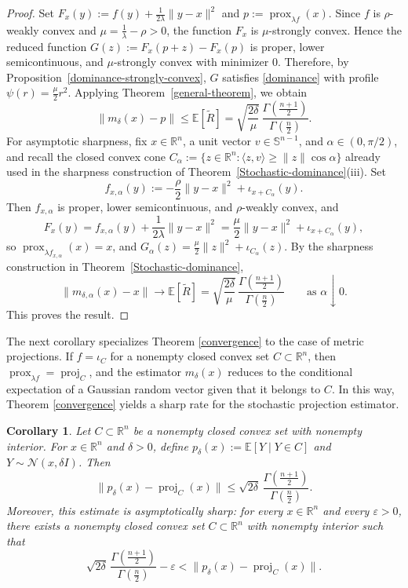 \documentclass[11pt]{article}
\newcommand{\1}{\mathds{1}}
\newtheorem{corollary}[theorem]{Corollary}
\theoremstyle{definition}
\theoremstyle{remark}
\theoremstyle{definition}
\begin{document}
\begin{proof}
Set $F_x(y):=f(y)+\frac{1}{2\lambda}\|y-x\|^2$ and $p:=\operatorname{prox}_{\lambda f}(x)$. Since \(f\) is \(\rho\)-weakly convex and \(\mu=\frac1\lambda-\rho>0\),
the function \(F_x\) is \(\mu\)-strongly convex. Hence the reduced function $G(z):=F_x(p+z)-F_x(p)$ is proper, lower semicontinuous, and \(\mu\)-strongly convex with minimizer
\(0\). Therefore, by Proposition~\ref{dominance-strongly-convex},
\(G\) satisfies \eqref{dominance} with profile
\(\psi(r)=\frac{\mu}{2}r^2\). Applying Theorem~\ref{general-theorem},
we obtain
\[
\|m_{\delta}(x)-p\|
\le
\mathbb{E}[\widetilde R]
=
\sqrt{\frac{2\delta}{\mu}}\,
\frac{\Gamma\!\left(\frac{n+1}{2}\right)}
{\Gamma\!\left(\frac{n}{2}\right)}.
\]
For asymptotic sharpness, fix \(x\in\mathbb R^n\), a unit vector \(v\in\mathbb S^{n-1}\), and \(\alpha\in(0,\pi/2)\), and recall the closed convex cone $C_\alpha:=\{z\in\mathbb R^n:\langle z,v\rangle\ge \|z\|\cos\alpha\}$ already used in the sharpness construction of Theorem~\ref{Stochastic-dominance}(iii). Set
\[
f_{x,\alpha}(y):=-\frac{\rho}{2}\|y-x\|^2+\iota_{x+C_\alpha}(y).
\]
Then \(f_{x,\alpha}\) is proper, lower semicontinuous, and \(\rho\)-weakly convex, and
\[
F_x(y)
=
f_{x,\alpha}(y)+\frac{1}{2\lambda}\|y-x\|^2
=
\frac{\mu}{2}\|y-x\|^2+\iota_{x+C_\alpha}(y),
\]
so \(\operatorname{prox}_{\lambda f_{x,\alpha}}(x)=x\), and  $G_\alpha(z)=\frac{\mu}{2}\|z\|^2+\iota_{C_\alpha}(z)$. By the sharpness construction in Theorem~\ref{Stochastic-dominance},
\[
\|m_{\delta,\alpha}(x)-x\|
\longrightarrow
\mathbb{E}[\widetilde R]
=
\sqrt{\frac{2\delta}{\mu}}\,
\frac{\Gamma\!\left(\frac{n+1}{2}\right)}
{\Gamma\!\left(\frac{n}{2}\right)}
\qquad\text{as }\alpha\downarrow 0.
\]
This proves the result.
\end{proof}
The next corollary specializes Theorem \ref{convergence} to the case of metric projections. If \(f=\iota_C\) for a nonempty closed convex set \(C\subset\mathbb R^n\), then \(\operatorname{prox}_{\lambda f}=\operatorname{proj}_C\), and the estimator \(m_\delta(x)\) reduces to the conditional expectation of a Gaussian random vector given that it belongs to \(C\). In this way, Theorem \ref{convergence} yields a sharp rate for the stochastic projection estimator.
\begin{corollary}
Let \(C\subset \mathbb{R}^n\) be a nonempty closed convex set with nonempty
interior. For \(x\in\mathbb{R}^n\) and \(\delta>0\), define $p_\delta(x):=\mathbb{E}[Y\mid Y\in C]$ and $Y\sim\mathcal N(x,\delta I)$. Then
\[
\|p_\delta(x)-\operatorname{proj}_C(x)\|
\le
\sqrt{2\delta}\,
\frac{\Gamma\!\left(\frac{n+1}{2}\right)}
{\Gamma\!\left(\frac{n}{2}\right)}.
\]
Moreover, this estimate is asymptotically sharp: for every
\(x\in\mathbb{R}^n\) and every \(\varepsilon>0\), there exists a nonempty
closed convex set \(C\subset\mathbb{R}^n\) with nonempty interior such that
\[
\sqrt{2\delta}\,
\frac{\Gamma\!\left(\frac{n+1}{2}\right)}
{\Gamma\!\left(\frac{n}{2}\right)}
-\varepsilon
<
\|p_\delta(x)-\operatorname{proj}_C(x)\|.
\]
\end{corollary}
\end{document}
